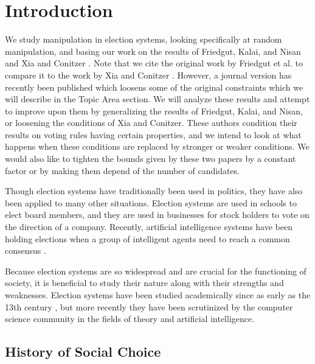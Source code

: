 
\chapter{Introduction}

We study manipulation in election systems, looking specifically at random manipulation, and basing our work on the results of Friedgut, Kalai, and Nisan \cite{friedgut2008elections} and Xia and Conitzer \cite{xia2008sufficient}. Note that we cite the original work by Friedgut et al. \cite{friedgut2008elections} to compare it to the work by Xia and Conitzer \cite{xia2008sufficient}. However, a journal version has recently been published which loosens some of the original constraints \cite{friedgut2011quantitative} which we will describe in the Topic Area section. We will analyze these results and attempt to improve upon them by generalizing the results of Friedgut, Kalai, and Nisan, or loosening the conditions of Xia and Conitzer.  These authors condition their results on voting rules having certain properties, and we intend to look at what happens when these conditions are replaced by stronger or weaker conditions. We would also like to tighten the bounds given by these two papers by a constant factor or by making them depend of the number of candidates.

Though election systems have traditionally been used in politics, they have also been applied to many other situations. Election systems are used in schools to elect board members, and they are used in businesses for stock holders to vote on the direction of a company. Recently, artificial intelligence systems have been holding elections when a group of intelligent agents need to reach a common consensus \cite{ephrati1991clarke, ephrati1993multi, pennock2000social, dwork2001rank, fagin2003efficient}.

Because election systems are so widespread and are crucial for the functioning of society, it is beneficial to study their nature along with their strengths and weaknesses. Election systems have been studied academically since as early as the 13th century \cite{hägele2001llull}, but more recently they have been scrutinized by the computer science community in the fields of theory and artificial intelligence.


\section{History of Social Choice}

